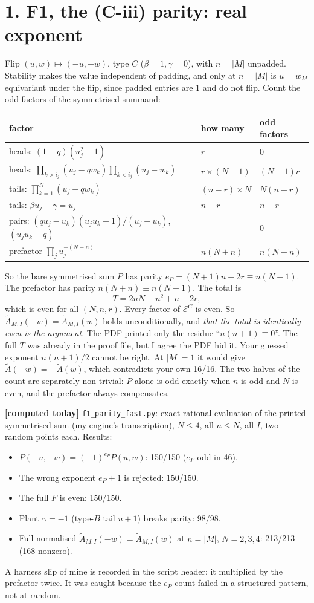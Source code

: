 \documentclass[10pt]{article}
\newcommand{\At}{\tilde A}
\begin{document}
\section*{1. F1, the (C-iii) parity: real exponent}
Flip $(u,w)\mapsto(-u,-w)$, type $C$ ($\beta=1,\gamma=0$), with $n=|M|$ unpadded. Stability makes the value independent of padding, and only at $n=|M|$ is
$u=w_M$ equivariant under the flip, since padded entries are $1$ and do not flip. Count the odd factors of the symmetrised summand:
\begin{center}\small
\begin{tabular}{lll}\toprule
factor & how many & odd factors\\\midrule
heads: $(1-q)(u_j^2-1)$ & $r$ & $0$\\
heads: $\prod_{k>i_j}(u_j-qw_k)\prod_{k<i_j}(u_j-w_k)$ & $r\times(N-1)$ & $(N-1)r$\\
tails: $\prod_{k=1}^N(u_j-qw_k)$ & $(n-r)\times N$ & $N(n-r)$\\
tails: $\beta u_j-\gamma=u_j$ & $n-r$ & $n-r$\\
pairs: $(qu_j-u_k)(u_ju_k-1)/(u_j-u_k)$, \ $(u_ju_k-q)$ & -- & $0$\\
prefactor $\prod_j u_j^{-(N+n)}$ & $n(N+n)$ & $n(N+n)$\\\bottomrule
\end{tabular}\end{center}
So the bare symmetrised sum $P$ has parity $e_P=(N+1)n-2r\equiv n(N+1)$. The prefactor has parity $n(N+n)\equiv n(N+1)$. The total is
\[T=2nN+n^2+n-2r,\]
which is even for all $(N,n,r)$. Every factor of $\mathcal E^C$ is even. So $\At_{M,I}(-w)=\At_{M,I}(w)$ holds unconditionally, and \emph{that the total
is identically even is the argument}. The PDF printed only the residue ``$n(n+1)\equiv0$''. The full $T$ was already in the proof file, but I agree the PDF hid it.
Your guessed exponent $n(n+1)/2$ cannot be right. At $|M|=1$ it would give $\At(-w)=-\At(w)$, which contradicts your own 16/16. The two halves of the count are separately non-trivial:
$P$ alone is odd exactly when $n$ is odd and $N$ is even, and the prefactor always compensates.

\textbf{[computed today]} \texttt{f1\_parity\_fast.py}: exact rational evaluation of the printed symmetrised sum (my engine's transcription), $N\le4$, all
$n\le N$, all $I$, two random points each. Results:
\begin{itemize}
\item $P(-u,-w)=(-1)^{e_P}P(u,w)$: 150/150 ($e_P$ odd in 46).
\item The wrong exponent $e_P+1$ is rejected: 150/150.
\item The full $F$ is even: 150/150.
\item Plant $\gamma=-1$ (type-$B$ tail $u+1$) breaks parity: 98/98.
\item Full normalised $\At_{M,I}(-w)=\At_{M,I}(w)$ at $n=|M|$, $N=2,3,4$: 213/213 (168 nonzero).
\end{itemize}
A harness slip of mine is recorded in the script header: it multiplied by the prefactor twice. It was caught because the
$e_P$ count failed in a structured pattern, not at random.
\end{document}

